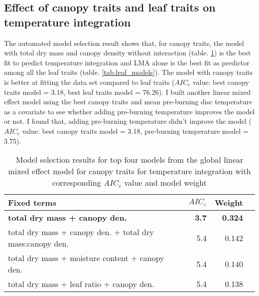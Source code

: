 \documentclass{ttuthes2007}
\begin{document}

\subsection{Effect of canopy traits and leaf traits on temperature integration}

The automated model selection result shows that, for canopy traits, the model with total dry mass and canopy density without interaction (table. \ref{tab:canopy_models}) is the best fit to predict temperature integration and \MakeUppercase{lma} alone is the best fit as predictor among all the leaf traits (table. \ref{tab:leaf_models}). The model with canopy traits is better at fitting the data set compared to leaf traits ($AIC_{c}$ value: best canopy traits model = 3.18, best leaf traits model = 76.26). I built another linear mixed effect model using the best canopy traits and mean pre-burning disc temperature as a covariate to see whether adding pre-burning temperature improves the model or not. I found that, adding pre-burning temperature didn't improve the model ($AIC_{c}$ value: best canopy traits model = 3.18, pre-burning temperature model = 3.75).

\begin{table}
  \centering
  \caption{Model selection results for top four models from the global linear
    mixed effect model for canopy traits for temperature integration with
    corresponding $AIC_{c}$ value and model weight}
  \vspace{0.5 cm}
  \begin{tabular}{lrrr}
    \toprule
    \textbf{Fixed terms} & $AIC_{c}$ & \textbf{Weight}\\
    \midrule
    \textbf{total dry mass + canopy den.}    & \textbf{3.7} &  \textbf{0.324}\\
    total dry mass + canopy den. + total dry mass:canopy den. & 5.4  & 0.142 \\
    total dry mass + moisture content + canopy den.   & 5.4   & 0.140 \\ 
    total dry mass + leaf ratio + canopy den.  & 5.4 & 0.138  \\
    \bottomrule
  \end{tabular}
  \label{tab:canopy_models}
\end{table}
\end{document}
